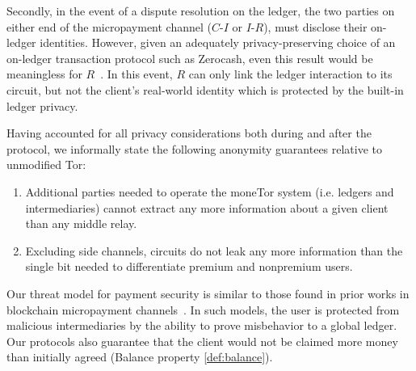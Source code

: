 Secondly, in the event of a dispute resolution on the ledger, the two parties on
either end of the micropayment channel ($C$-$I$ or $I$-$R$), must disclose their
on-ledger identities. 
However, given an adequately privacy-preserving choice of an on-ledger
transaction protocol such as Zerocash, even this result would be meaningless for
$R$~\cite{sasson2014zerocash}. In this event, $R$ can only link the ledger
interaction to its circuit, but not the client's real-world identity which is
protected by the built-in ledger privacy.

Having accounted for all privacy considerations both during and after the
protocol, we informally state the following anonymity guarantees relative to
unmodified Tor:

\begin{enumerate}
\item Additional parties needed to operate the moneTor system (i.e. ledgers and
  intermediaries) cannot extract any more information about a given client than
  any middle relay.
\item Excluding side channels, circuits do not leak any more information than
  the single bit needed to differentiate premium and nonpremium users.
\end{enumerate}

Our threat model for payment security is similar to those found in prior works
in blockchain micropayment channels~\cite{poon2016bitcoin}. In such models, the
user is protected from malicious intermediaries by the ability to prove
misbehavior to a global ledger. Our protocols also guarantee that the client
would not be claimed more money than initially agreed (Balance property
\ref{def:balance}).

